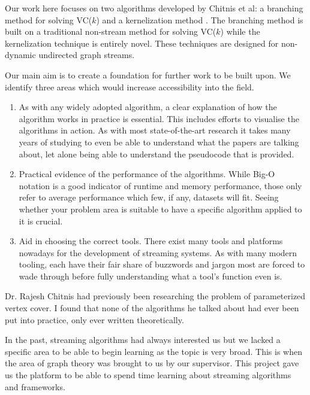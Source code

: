 Our work here focuses on two algorithms developed by Chitnis et
al: a branching method for solving VC(\(k\)) \cite{chitnis2019towards} and a
kernelization method \cite{chitnis2015parameterized}. The branching method is built
on a traditional non-stream method for solving VC(\(k\)) while the
kernelization technique is entirely novel. These techniques are designed
for non-dynamic undirected graph streams.

Our main aim is to create a foundation for further work to be built
upon. We identify three areas which would increase accessibility into
the field.

\begin{enumerate}
    \item
          As with any widely adopted algorithm, a clear explanation of how the
          algorithm works in practice is essential. This includes efforts to
          visualise the algorithms in action. As with most state-of-the-art
          research it takes many years of studying to even be able to understand
          what the papers are talking about, let alone being able to understand
          the pseudocode that is provided.
    \item
          Practical evidence of the performance of the algorithms. While Big-O
          notation is a good indicator of runtime and memory performance, those
          only refer to average performance which few, if any, datasets will
          fit. Seeing whether your problem area is suitable to have a specific
          algorithm applied to it is crucial.
    \item
          Aid in choosing the correct tools. There exist many tools and
          platforms nowadays for the development of streaming systems. As with
          many modern tooling, each have their fair share of buzzwords and
          jargon most are forced to wade through before fully understanding what
          a tool's function even is.
\end{enumerate}

Dr. Rajesh Chitnis had previously been researching the problem
of parameterized vertex cover. I found that none of the algorithms he
talked about had ever been put into practice, only ever written
theoretically.

In the past, streaming algorithms had always interested us but we lacked
a specific area to be able to begin learning as the topic is very broad.
This is when the area of graph theory was brought to us by our
supervisor. This project gave us the platform to be able to spend time
learning about streaming algorithms and frameworks.